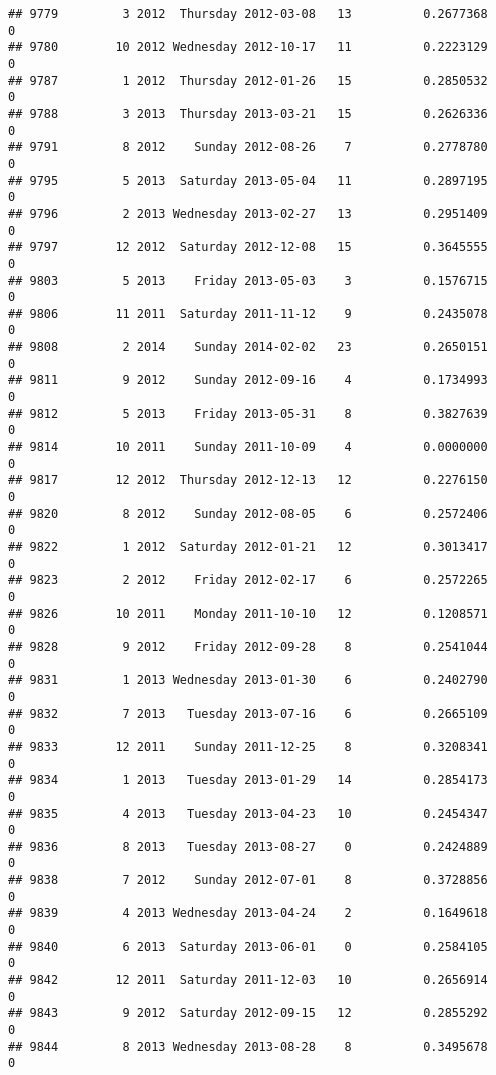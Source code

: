 \documentclass[
]{article}
\begin{document}
\begin{verbatim}
## 9779         3 2012  Thursday 2012-03-08   13          0.2677368             0
## 9780        10 2012 Wednesday 2012-10-17   11          0.2223129             0
## 9787         1 2012  Thursday 2012-01-26   15          0.2850532             0
## 9788         3 2013  Thursday 2013-03-21   15          0.2626336             0
## 9791         8 2012    Sunday 2012-08-26    7          0.2778780             0
## 9795         5 2013  Saturday 2013-05-04   11          0.2897195             0
## 9796         2 2013 Wednesday 2013-02-27   13          0.2951409             0
## 9797        12 2012  Saturday 2012-12-08   15          0.3645555             0
## 9803         5 2013    Friday 2013-05-03    3          0.1576715             0
## 9806        11 2011  Saturday 2011-11-12    9          0.2435078             0
## 9808         2 2014    Sunday 2014-02-02   23          0.2650151             0
## 9811         9 2012    Sunday 2012-09-16    4          0.1734993             0
## 9812         5 2013    Friday 2013-05-31    8          0.3827639             0
## 9814        10 2011    Sunday 2011-10-09    4          0.0000000             0
## 9817        12 2012  Thursday 2012-12-13   12          0.2276150             0
## 9820         8 2012    Sunday 2012-08-05    6          0.2572406             0
## 9822         1 2012  Saturday 2012-01-21   12          0.3013417             0
## 9823         2 2012    Friday 2012-02-17    6          0.2572265             0
## 9826        10 2011    Monday 2011-10-10   12          0.1208571             0
## 9828         9 2012    Friday 2012-09-28    8          0.2541044             0
## 9831         1 2013 Wednesday 2013-01-30    6          0.2402790             0
## 9832         7 2013   Tuesday 2013-07-16    6          0.2665109             0
## 9833        12 2011    Sunday 2011-12-25    8          0.3208341             0
## 9834         1 2013   Tuesday 2013-01-29   14          0.2854173             0
## 9835         4 2013   Tuesday 2013-04-23   10          0.2454347             0
## 9836         8 2013   Tuesday 2013-08-27    0          0.2424889             0
## 9838         7 2012    Sunday 2012-07-01    8          0.3728856             0
## 9839         4 2013 Wednesday 2013-04-24    2          0.1649618             0
## 9840         6 2013  Saturday 2013-06-01    0          0.2584105             0
## 9842        12 2011  Saturday 2011-12-03   10          0.2656914             0
## 9843         9 2012  Saturday 2012-09-15   12          0.2855292             0
## 9844         8 2013 Wednesday 2013-08-28    8          0.3495678             0

\end{verbatim}
\end{document}
